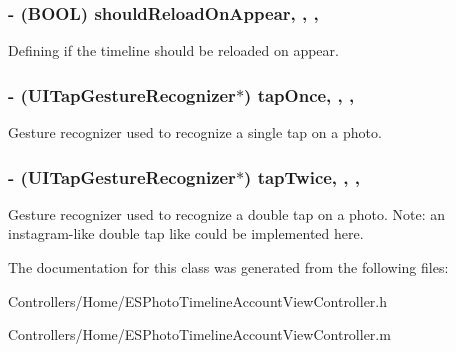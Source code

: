 \subsubsection[{should\+Reload\+On\+Appear}]{\setlength{\rightskip}{0pt plus 5cm}-\/ (B\+O\+O\+L) should\+Reload\+On\+Appear\hspace{0.3cm}{\ttfamily [read]}, {\ttfamily [write]}, {\ttfamily [nonatomic]}, {\ttfamily [assign]}}\label{interface_e_s_photo_timeline_account_view_controller_a976b660303e7268207f0aa28effb3cce}
Defining if the timeline should be reloaded on appear. \hypertarget{interface_e_s_photo_timeline_account_view_controller_a7d7d30619f0d39e4c8750fdd768017c2}{}
\subsubsection[{tap\+Once}]{\setlength{\rightskip}{0pt plus 5cm}-\/ (U\+I\+Tap\+Gesture\+Recognizer$\ast$) tap\+Once\hspace{0.3cm}{\ttfamily [read]}, {\ttfamily [write]}, {\ttfamily [nonatomic]}, {\ttfamily [strong]}}\label{interface_e_s_photo_timeline_account_view_controller_a7d7d30619f0d39e4c8750fdd768017c2}
Gesture recognizer used to recognize a single tap on a photo. \hypertarget{interface_e_s_photo_timeline_account_view_controller_af9b1728e7ee6a6bff93bc5359aa65ca1}{}
\subsubsection[{tap\+Twice}]{\setlength{\rightskip}{0pt plus 5cm}-\/ (U\+I\+Tap\+Gesture\+Recognizer$\ast$) tap\+Twice\hspace{0.3cm}{\ttfamily [read]}, {\ttfamily [write]}, {\ttfamily [nonatomic]}, {\ttfamily [strong]}}\label{interface_e_s_photo_timeline_account_view_controller_af9b1728e7ee6a6bff93bc5359aa65ca1}
Gesture recognizer used to recognize a double tap on a photo. Note\+: an instagram-\/like double tap like could be implemented here. 

The documentation for this class was generated from the following files\+:\begin{DoxyCompactItemize}
\item 
Controllers/\+Home/E\+S\+Photo\+Timeline\+Account\+View\+Controller.\+h\item 
Controllers/\+Home/E\+S\+Photo\+Timeline\+Account\+View\+Controller.\+m\end{DoxyCompactItemize}

